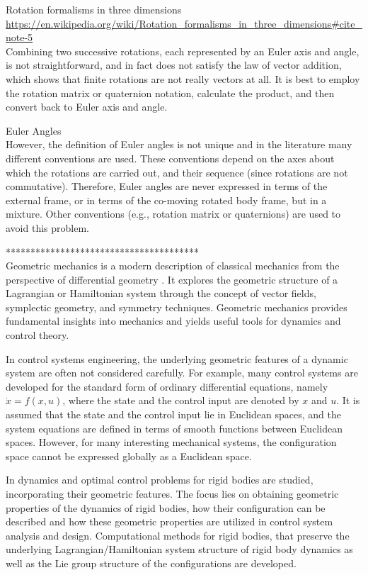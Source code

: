 Rotation formalisms in three dimensions \url{https://en.wikipedia.org/wiki/Rotation_formalisms_in_three_dimensions#cite_note-5}\\
Combining two successive rotations, each represented by an Euler axis and angle, is not straightforward, and in fact does not satisfy the law of vector addition, which shows that finite rotations are not really vectors at all. It is best to employ the rotation matrix or quaternion notation, calculate the product, and then convert back to Euler axis and angle.

Euler Angles\\
However, the definition of Euler angles is not unique and in the literature many different conventions are used. These conventions depend on the axes about which the rotations are carried out, and their sequence (since rotations are not commutative). Therefore, Euler angles are never expressed in terms of the external frame, or in terms of the co-moving rotated body frame, but in a mixture. Other conventions (e.g., rotation matrix or quaternions) are used to avoid this problem.

***************************************\\
Geometric mechanics is a modern description of classical mechanics from the perspective of differential geometry \cite{Bullo2005,Jurdjevic1997}. It explores the geometric structure of a Lagrangian or Hamiltonian system through the concept of vector fields, symplectic geometry, and symmetry techniques. Geometric mechanics provides fundamental insights into mechanics and yields useful tools for dynamics and control theory.

In control systems engineering, the underlying geometric features of a dynamic system are often not considered carefully. For example, many control systems are developed for the standard form of ordinary differential equations, namely $ \dot{x}=f(x,u) $, where the state and the control input are denoted by $ x $ and $ u $. It is assumed that the state and the control input lie in Euclidean spaces, and the system equations are defined in terms of smooth functions between Euclidean spaces. However, for many interesting mechanical systems, the configuration space cannot be expressed globally as a Euclidean space.

In \cite{Lee2008} dynamics and optimal control problems for rigid bodies are studied, incorporating their geometric features. The focus lies on obtaining geometric properties of the dynamics of rigid bodies, how their configuration can be described and how these geometric properties are utilized in control system analysis and design. Computational methods for rigid bodies, that preserve the underlying Lagrangian/Hamiltonian system structure of rigid body dynamics as well as the Lie group structure of the configurations are developed.


